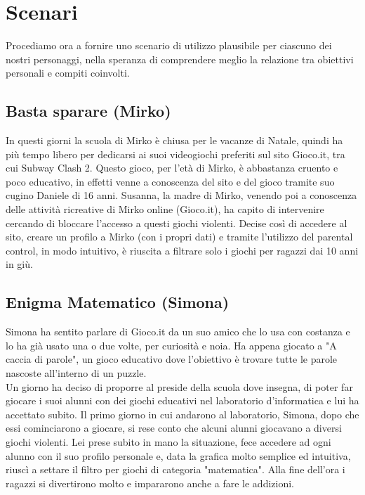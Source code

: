 \documentclass[../Report.tex]{subfiles}
\begin{document}
    \section{Scenari}
    Procediamo ora a fornire uno scenario di utilizzo plausibile per ciascuno dei nostri personaggi, nella speranza di comprendere meglio la relazione tra obiettivi personali e compiti coinvolti.

    \subsection{Basta sparare (Mirko)}
    In questi giorni la scuola di Mirko è chiusa per le vacanze di Natale, quindi ha più tempo libero per dedicarsi ai suoi videogiochi preferiti sul sito Gioco.it, tra cui Subway Clash 2. Questo gioco, per l'età di Mirko, è abbastanza cruento e poco educativo, in effetti venne a conoscenza del sito e del gioco tramite suo cugino Daniele di 16 anni. Susanna, la madre di Mirko, venendo poi a conoscenza delle attività ricreative di Mirko online (Gioco.it), ha capito di intervenire cercando di bloccare l'accesso a questi giochi violenti. Decise così di accedere al sito, creare un profilo a Mirko (con i propri dati) e tramite l'utilizzo del parental control, in modo intuitivo, è riuscita a filtrare solo i giochi per ragazzi dai 10 anni in giù.

    \subsection{Enigma Matematico (Simona)}
    Simona ha sentito parlare di Gioco.it da un suo amico che lo usa con costanza e lo ha già usato una o due volte, per curiosità e noia. Ha appena giocato a "A caccia di parole", un gioco educativo dove l'obiettivo è trovare tutte le parole nascoste all'interno di un puzzle.\\
    Un giorno ha deciso di proporre al preside della scuola dove insegna, di poter far giocare i suoi alunni con dei giochi educativi nel laboratorio d'informatica e lui ha accettato subito. Il primo giorno in cui andarono al laboratorio, Simona, dopo che essi cominciarono a giocare, si rese conto che alcuni alunni giocavano a diversi giochi violenti. Lei prese subito in mano la situazione, fece accedere ad ogni alunno con il suo profilo personale e, data la grafica molto semplice ed intuitiva, riuscì a settare il filtro per giochi di categoria "matematica". Alla fine dell'ora i ragazzi si divertirono molto e impararono anche a fare le addizioni.
\end{document}
